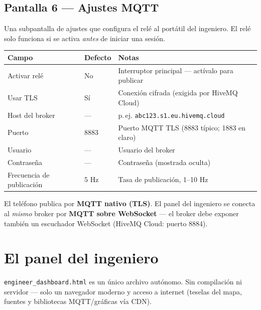 \documentclass[11pt,a4paper,oneside]{report}
\newcommand{\code}[1]{\texttt{#1}}
\begin{document}
\subsection{Pantalla 6 --- Ajustes MQTT}
Una subpantalla de ajustes que configura el relé al portátil del ingeniero. El relé
solo funciona si se activa \emph{antes} de iniciar una sesión.

\begin{tabularx}{\linewidth}{@{}llL@{}}
\toprule
\textbf{Campo} & \textbf{Defecto} & \textbf{Notas}\\
\midrule
Activar relé & No & Interruptor principal --- actívalo para publicar\\
Usar TLS & Sí & Conexión cifrada (exigida por HiveMQ Cloud)\\
Host del broker & --- & p.\,ej. \code{abc123.s1.eu.hivemq.cloud}\\
Puerto & 8883 & Puerto MQTT TLS (8883 típico; 1883 en claro)\\
Usuario & --- & Usuario del broker\\
Contraseña & --- & Contraseña (mostrada oculta)\\
Frecuencia de publicación & 5 Hz & Tasa de publicación, 1--10 Hz\\
\bottomrule
\end{tabularx}
\begin{tgnote}
El teléfono publica por \textbf{MQTT nativo (TLS)}. El panel del ingeniero se conecta
al \emph{mismo} broker por \textbf{MQTT sobre WebSocket} --- el broker debe exponer
también un escuchador WebSocket (HiveMQ Cloud: puerto 8884).
\end{tgnote}

\section{El panel del ingeniero}
\code{engineer\_dashboard.html} es un único archivo autónomo. Sin compilación ni
servidor --- solo un navegador moderno y acceso a internet (teselas del mapa, fuentes
y bibliotecas MQTT/gráficas vía CDN).
\end{document}
